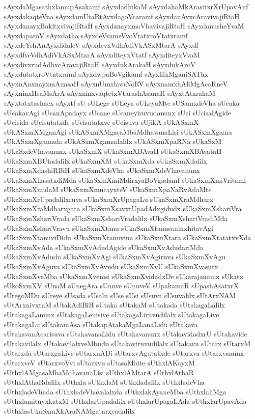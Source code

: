 {sAyxdaMgasathxlamupAsakamf
sAyxdadhikaM
sAyxdahaMkArasitxrXrUpavAnf
sAyxdakaqteVna
sAyxdamUtaRtAvxdagoVcaramf
sAyxdanAyxcAravivajiRtaH
sAyxdanayxBakitxvivajiRtaH
sAyxdanayxmoVhavivajiRtaH
sAyxdanusheYvaM
sAyxdaparoV
sAyxdatha
sAyxdeVvameVvoVtatxroVtatxramf
sAyxdeYshAnAyxdidaleV
sAyxdevxVdhAdiVkASxMtarA
sAyxdf
sAyxdfveVdhAdiVkASxMtarA
sAyxditeyxVtatf
sAyxditeyxVvaM
sAyxdivxrudAdhxcAravajiRtaH
sAyxdukArakaH
sAyxdukAroV
sAyxdutatxroVtatxramf
sAyxdwpaBoVgikamf
sAyxlilxMganiSAThx
sAyxnAnxnayxmAnasaH
sAyxnUmxlavaNoRV
sAyxnamxhAliMgAcaRneV
sAyxninxHsaMsArA
sAyxninxvaqtetxVtarashAsanaH
sAyxtAtxrakaM
sAyxtatxtashacx
sAyxtf
sU
sULege
sULeya
sULeyaMte
sUSamxdeVha
sUcaka
sUcakavAgi
sUcanApadayx
sUcane
sUcaneyiruvudanunx
sUci
sUcisalAgide
sUcisida
sUcisutatxde
sUcisutatxve
sUcisuva
sUjikA
sUkASxmX
sUkASxmXMganAgi
sUkASxmXMgasaMbaMdhavanaLisi
sUkASxmXgama
sUkASxmXgamada
sUkASxmXgamadalilx
sUkASxmXpaRNa
sUkaSxM
sUkaSxdeVhavanunx
sUkaSxmX
sUkaSxmXBAvaH
sUkaSxmXBAvataH
sUkaSxmXBUtadalilx
sUkaSxmXM
sUkaSxmXda
sUkaSxmXdalilx
sUkaSxmXdashiRBiH
sUkaSxmXdeVha
sUkaSxmXdeVhavanunx
sUkaSxmXhasatxdiMda
sUkaSxmXmiMdirxyaBoVgadamf
sUkaSxmXmiVritamf
sUkaSxmXmidaM
sUkaSxmXmucayxteV
sUkaSxmXpaNaRvAdaMte
sUkaSxmXrUpadalilxruva
sUkaSxmXrUpagaLu
sUkaSxmXraMdharx
sUkaSxmXraMdharxgata
sUkaSxmXsavxrUpadAdxgidudx
sUkaSxmXshariVra
sUkaSxmXshariVrada
sUkaSxmXshariVradalilx
sUkaSxmXshariVradiMda
sUkaSxmXshariVravu
sUkaSxmXtanu
sUkaSxmXtanusaninxhitavAgi
sUkaSxmXtanuviDidu
sUkaSxmXtanuvina
sUkaSxmXtara
sUkaSxmXtatatxvXda
sUkaSxmXvAda
sUkaSxmXvAdudAgide
sUkaSxmXvAdudariMda
sUkaSxmXvAdudu
sUkaSxmXvAgi
sUkaSxmXvAgiruva
sUkaSxmXvAgu
sUkaSxmXvAguva
sUkaSxmXvAvudu
sUkaSxmXvU
sUkaSxmXvasutx
sUkaSxmXveMba
sUkaSxmXvenisi
sUkaSxmXvidadxDe
sUkarajanamx
sUkatx
sUkoSxmXV
sUnaM
sUnegAra
sUnuve
sUnuveV
sUpakamaR
sUpashAsatxrX
sUregoMDu
sUreye
sUsada
sUsalu
sUse
sUsi
sUsuva
sUsuvalilx
sUtArxNAM
sUtArxnivxtaM
sUtakAdiBiH
sUtaka
sUtakaM
sUtakada
sUtakagaLalilx
sUtakagaLanunx
sUtakagaLenisive
sUtakagaLiruvudilalx
sUtakagaLive
sUtakagaLu
sUtakamAsa
sUtakapAtakaMgaLanaLidu
sUtakava
sUtakavanAcarisuva
sUtakavanaLidu
sUtakavanunx
sUtakavidadxrU
sUtakavide
sUtakavilalx
sUtakavilalxveMbudu
sUtakaviruvudilalx
sUtakavu
sUtarx
sUtarxM
sUtarxda
sUtarxgaLive
sUtarxnADi
sUtarxvAgutatxde
sUtarxva
sUtarxvanunx
sUtarxveV
sUtarxvoVvi
sUtarxvu
sUtasaMhite
sUthxlAKayxM
sUthxlAMgasaMbaMdhavanaLisi
sUthxlAMtarA
sUthxlAthaR
sUthxlAthaRdalilx
sUthxla
sUthxlaM
sUthxladalilx
sUthxladeVha
sUthxladeVhada
sUthxladeVhavalalxda
sUthxlakAyaneMba
sUthxlaliMga
sUthxlamituyxkatxM
sUthxlarUpadalilx
sUthxlarUpagaLAda
sUthxlarUpavAda
sUthxlasUkaSxmXkAraNAMgatarxyadalilx
}
